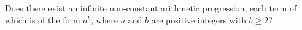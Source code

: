 Does there exist an infinite non-constant arithmetic progression, each term of which is of the form $a^b$,  where $a$ and $b$ are positive integers with $b\ge 2$?